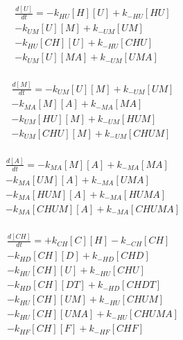 \begin{equation}
\begin{split}
\frac{d[U]}{dt} =     - k_{HU}[H][U]    + k_{-HU}[HU]     \\%
                      - k_{UM}[U][M]    + k_{-UM}[UM]     \\%
                      - k_{HU}[CH][U]   + k_{-HU}[CHU]    \\%
                      - k_{UM}[U][MA]   + k_{-UM}[UMA]    \\%
\end{split}
\end{equation}

\begin{equation}
\begin{split}
\frac{d[M]}{dt} =     - k_{UM}[U][M]    + k_{-UM}[UM]     \\%
                      - k_{MA}[M][A]    + k_{-MA}[MA]     \\%
                      - k_{UM}[HU][M]   + k_{-UM}[HUM]    \\%
                      - k_{UM}[CHU][M]  + k_{-UM}[CHUM]   \\%
\end{split}
\end{equation}

\begin{equation}
\begin{split}
\frac{d[A]}{dt} =     - k_{MA}[M][A]    + k_{-MA}[MA]     \\%
                      - k_{MA}[UM][A]   + k_{-MA}[UMA]    \\%
                      - k_{MA}[HUM][A]  + k_{-MA}[HUMA]   \\%
                      - k_{MA}[CHUM][A] + k_{-MA}[CHUMA]  \\%
\end{split}
\end{equation}

\begin{equation}
\begin{split}
\frac{d[CH]}{dt} =    + k_{CH}[C][H]    - k_{-CH}[CH]     \\%
                      - k_{HD}[CH][D]   + k_{-HD}[CHD]    \\%
                      - k_{HU}[CH][U]   + k_{-HU}[CHU]    \\%
                      - k_{HD}[CH][DT]  + k_{-HD}[CHDT]   \\%
                      - k_{HU}[CH][UM]  + k_{-HU}[CHUM]   \\%
                      - k_{HU}[CH][UMA] + k_{-HU}[CHUMA]  \\%
                      - k_{HF}[CH][F] + k_{-HF}[CHF]      \\%
\end{split}
\end{equation}

